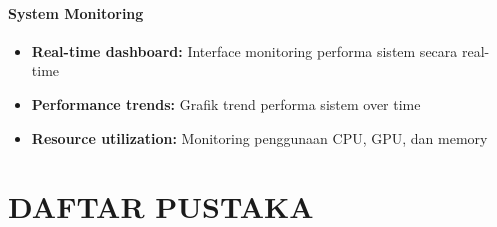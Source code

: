 \documentclass[12pt,a4paper]{report}
\begin{document}
\subsubsection{System Monitoring}

\begin{itemize}
    \item \textbf{Real-time dashboard:} Interface monitoring performa sistem secara real-time
    \item \textbf{Performance trends:} Grafik trend performa sistem over time
    \item \textbf{Resource utilization:} Monitoring penggunaan CPU, GPU, dan memory
\end{itemize}

\chapter*{DAFTAR PUSTAKA}
\end{document}
